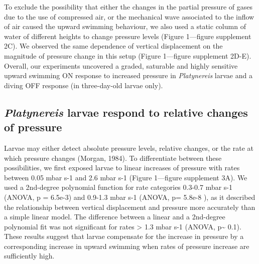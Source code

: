 \documentclass[
  11pt,
]{article}
\begin{document}
To exclude the possibility that either the changes in the partial
pressure of gases due to the use of compressed air, or the mechanical
wave associated to the inflow of air caused the upward swimming
behaviour, we also used a static column of water of different heights to
change pressure levels (Figure 1---figure supplement 2C). We observed
the same dependence of vertical displacement on the magnitude of
pressure change in this setup (Figure 1---figure supplement 2D-E).
Overall, our experiments uncovered a graded, saturable and highly
sensitive upward swimming ON response to increased pressure in
\emph{Platynereis} larvae and a diving OFF response (in three-day-old
larvae only).

\subsection{\texorpdfstring{\emph{Platynereis} larvae respond to
relative changes of
pressure}{Platynereis larvae respond to relative changes of pressure}}\label{platynereis-larvae-respond-to-relative-changes-of-pressure}

Larvae may either detect absolute pressure levels, relative changes, or
the rate at which pressure changes (Morgan, 1984). To differentiate
between these possibilities, we first exposed larvae to linear increases
of pressure with rates between 0.05 mbar s-1 and 2.6 mbar s-1 (Figure
1---figure supplement 3A). We used a 2nd-degree polynomial function for
rate categories 0.3-0.7 mbar s-1 (ANOVA, p = 6.5e-3) and 0.9-1.3 mbar
s-1 (ANOVA, p= 5.8e-8 ), as it described the relationship between
vertical displacement and pressure more accurately than a simple linear
model. The difference between a linear and a 2nd-degree polynomial fit
was not significant for rates \textgreater{} 1.3 mbar s-1 (ANOVA,
p\textasciitilde{} 0.1). These results suggest that larvae compensate
for the increase in pressure by a corresponding increase in upward
swimming when rates of pressure increase are sufficiently high.
\end{document}
